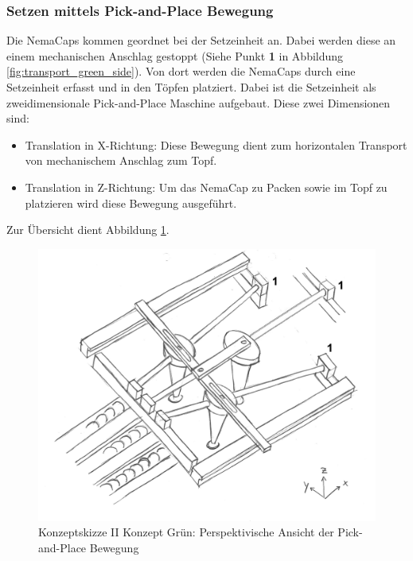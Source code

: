 \subsubsection{Setzen mittels Pick-and-Place Bewegung}
Die NemaCaps kommen geordnet bei der Setzeinheit an. Dabei werden diese an einem mechanischen Anschlag gestoppt (Siehe Punkt \textbf{1} in Abbildung \ref{fig:transport_green_side}). Von dort werden die NemaCaps durch eine Setzeinheit erfasst und in den Töpfen platziert. Dabei ist die Setzeinheit als zweidimensionale Pick-and-Place Maschine aufgebaut. Diese zwei Dimensionen sind:
\begin{itemize}
	\item Translation in X-Richtung: Diese Bewegung dient zum horizontalen Transport von mechanischem Anschlag zum Topf.
	\item Translation in Z-Richtung: Um das NemaCap zu Packen sowie im Topf zu platzieren wird diese Bewegung ausgeführt.
\end{itemize}
Zur Übersicht dient Abbildung \ref{fig:transport_green_pers}. 
\begin{figure}[H]
	\includegraphics[scale=0.6]{Illustrationen/5-Konzept/green_2Dmachine_pervsp.jpg}
	\caption{Konzeptskizze II Konzept Grün: Perspektivische Ansicht der Pick-and-Place Bewegung}
	\label{fig:transport_green_pers}
\end{figure}

